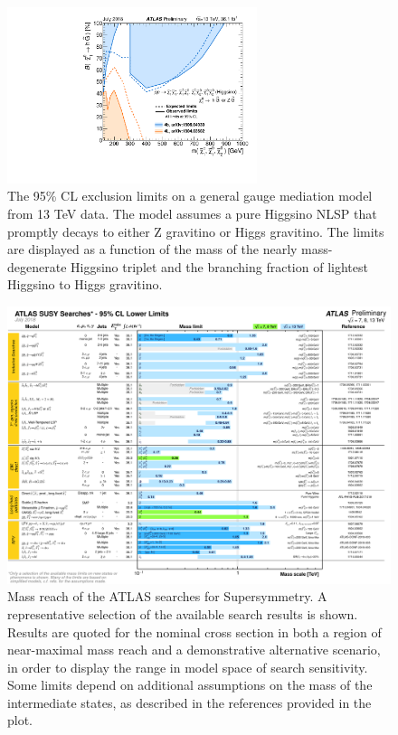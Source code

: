 \begin{figure}[htbp]
	\centering
	\includegraphics[width=0.65\textwidth]{figures/summary_plots/ATLAS_SUSY_EWSummary_GGM.pdf}
	\caption{The 95\% CL exclusion limits on a general gauge mediation model from 13 TeV data. 
	The model assumes a pure Higgsino NLSP that promptly decays to either Z gravitino or Higgs gravitino. 
	The limits are displayed as a function of the mass of the nearly mass-degenerate Higgsino triplet and the branching fraction of lightest Higgsino to Higgs gravitino. 	
	} 
	\label{fig:summary_atlas_higgsino_GMSB}
\end{figure}

\FloatBarrier


\begin{figure}[htbp]
	\centering
	\includegraphics[width=1\textwidth]{figures/summary_plots/ATLAS_SUSY_Summary.png}
	\caption{	Mass reach of the ATLAS searches for Supersymmetry. 
	A representative selection of the available search results is shown. Results are quoted for the nominal cross section 
	in both a region of near-maximal mass reach and a demonstrative alternative scenario, in order to display the range in 
	model space of search sensitivity. Some limits depend on additional assumptions on the mass of the intermediate states, 
	as described in the references provided in the plot. 
	} 
	\label{fig:summary_atlas_summary}
\end{figure}